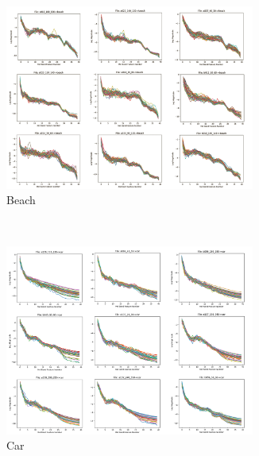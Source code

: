 \documentclass[11pt]{article}
\begin{document}
\begin{figure}[!htbp]
	\centering
	\begin{subfigure}[t]{0.54\textwidth}
		\centering
		\includegraphics[width=0.9\textwidth]{figures/beachgrid.png}
		\caption{Beach}
	\end{subfigure}
	\\
	\vspace{0.2cm}
	\begin{subfigure}[t]{0.54\textwidth}
		\centering
		\includegraphics[width=0.9\textwidth]{figures/cargrid.png}
		\caption{Car}
	\end{subfigure}
	\\
	\vspace{0.2cm}
	\begin{subfigure}[t]{0.54\textwidth}
		\centering

\end{subfigure}
\end{figure}
\end{document}
